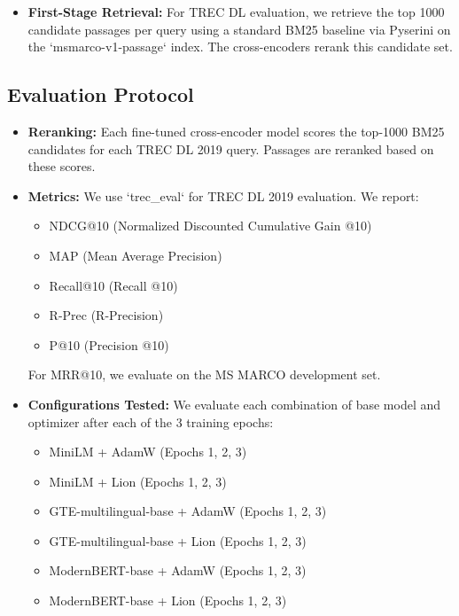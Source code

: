 \documentclass[conference]{IEEEtran}
\begin{document}
\begin{itemize}
\begin{itemize}
        \item Experiment tracking, visualization of training metrics (such as loss and learning rate), and hyperparameter logging were managed using the Weights \& Biases (W\&B) platform \cite{wandb2020}.
    \end{itemize}

    \item \textbf{First-Stage Retrieval:} For TREC DL evaluation, we retrieve the top 1000 candidate passages per query using a standard BM25 baseline via Pyserini \cite{lin2021pyserini} on the `msmarco-v1-passage` index. The cross-encoders rerank this candidate set.
\end{itemize}

\subsection{Evaluation Protocol}
\begin{itemize}
    \item \textbf{Reranking:} Each fine-tuned cross-encoder model scores the top-1000 BM25 candidates for each TREC DL 2019 query. Passages are reranked based on these scores.
    \item \textbf{Metrics:} We use `trec\_eval` \cite{trec_eval_github} for TREC DL 2019 evaluation. We report:
        \begin{itemize}
            \item NDCG@10 (Normalized Discounted Cumulative Gain @10)
            \item MAP (Mean Average Precision)
            \item Recall@10 (Recall @10)
            \item R-Prec (R-Precision)
            \item P@10 (Precision @10)
        \end{itemize}
    For MRR@10, we evaluate on the MS MARCO development set.
    \item \textbf{Configurations Tested:} We evaluate each combination of base model and optimizer after each of the 3 training epochs:
        \begin{itemize}
            \item MiniLM + AdamW (Epochs 1, 2, 3)
            \item MiniLM + Lion (Epochs 1, 2, 3)
            \item GTE-multilingual-base + AdamW (Epochs 1, 2, 3)
            \item GTE-multilingual-base + Lion (Epochs 1, 2, 3)
            \item ModernBERT-base + AdamW (Epochs 1, 2, 3)
            \item ModernBERT-base + Lion (Epochs 1, 2, 3)
        \end{itemize}
\end{itemize}
\end{document}
